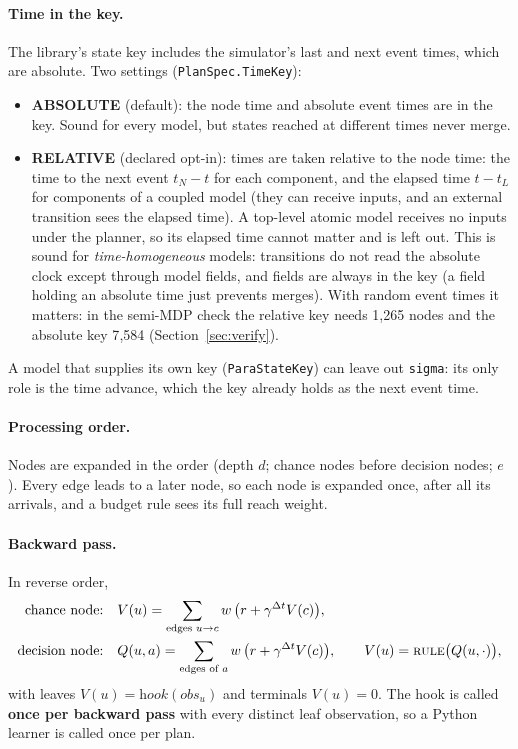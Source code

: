 \documentclass[11pt]{article}
\newcommand{\code}[1]{\texttt{#1}}
\theoremstyle{plain}
\begin{document}
\paragraph{Time in the key.} The library's state key includes the simulator's last and next event times, which are
absolute. Two settings (\code{PlanSpec.TimeKey}):
\begin{itemize}
\item \textbf{ABSOLUTE} (default): the node time and absolute event times are in the key. Sound for every model, but
  states reached at different times never merge.
\item \textbf{RELATIVE} (declared opt-in): times are taken relative to the node time: the time to the next event
  $t_N-t$ for each component, and the elapsed time $t-t_L$ for components of a coupled model (they can receive inputs,
  and an external transition sees the elapsed time). A top-level atomic model receives no inputs under the planner,
  so its elapsed time cannot matter and is left out. This is sound for \emph{time-homogeneous} models: transitions do
  not read the absolute clock except through model fields, and fields are always in the key (a field holding an
  absolute time just prevents merges). With random event times it matters: in the semi-MDP check the relative key
  needs 1{,}265 nodes and the absolute key 7{,}584 (Section~\ref{sec:verify}).
\end{itemize}
A model that supplies its own key (\code{ParaStateKey}) can leave out \code{sigma}: its only role is the time advance,
which the key already holds as the next event time.

\paragraph{Processing order.} Nodes are expanded in the order (depth $d$; chance nodes before decision nodes; $e$).
Every edge leads to a later node, so each node is expanded once, after all its arrivals, and a budget rule sees its
full reach weight.

\paragraph{Backward pass.} In reverse order,
\begin{align*}
\text{chance node:}\quad & V(u)=\sum_{\text{edges }u\to c} w\,\big(r+\gamma^{\Delta t}V(c)\big),\\
\text{decision node:}\quad & Q(u,a)=\sum_{\text{edges of }a} w\,\big(r+\gamma^{\Delta t}V(c)\big),\qquad
  V(u)=\textsc{rule}\big(Q(u,\cdot)\big),
\end{align*}
with leaves $V(u)=\textit{hook}(\textit{obs}_u)$ and terminals $V(u)=0$. The hook is called \textbf{once per backward
pass} with every distinct leaf observation, so a Python learner is called once per plan.
\end{document}
